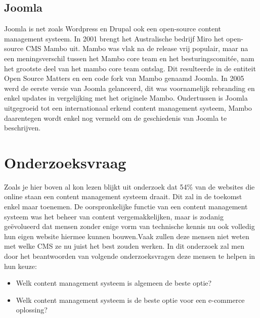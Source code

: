 \subsection{Joomla}
Joomla is net zoals Wordpress en Drupal ook een open-source content management systeem. In 2001 brengt het Australische bedrijf Miro het open-source CMS Mambo uit. Mambo was vlak na de release vrij populair, maar na een meningsverschil tussen het Mambo core team en het besturingscomitée, nam het grootste deel van het mambo core team ontslag. Dit resulteerde in de entiteit Open Source Matters en een code fork van Mambo genaamd Joomla. In 2005 werd de eerste versie van Joomla gelanceerd, dit was voornamelijk rebranding en enkel updates in vergelijking met het originele Mambo. Ondertussen is Joomla uitgegroeid tot een internationaal erkend content management systeem, Mambo daarentegen wordt enkel nog vermeld om de geschiedenis van Joomla te beschrijven.\autocite{Crowder2009} 


\section{Onderzoeksvraag}
\label{sec:onderzoeksvraag}

Zoals je hier boven al kon lezen blijkt uit onderzoek dat 54\% van de websites die online staan een content management systeem draait. Dit zal in de toekomst enkel maar toenemen. De oorspronkelijke functie van een content management systeem was het beheer van content vergemakkelijken, maar is zodanig geëvolueerd dat mensen zonder enige vorm van technische kennis nu ook volledig hun eigen website hiermee kunnen bouwen.Vaak zullen deze mensen niet weten met welke CMS ze nu juist het best zouden werken. In dit onderzoek zal men door het beantwoorden van volgende onderzoeksvragen deze mensen te helpen in hun keuze:
\begin{itemize}
	\item Welk content management systeem is algemeen de beste optie?
	\item Welk content management systeem is de beste optie voor een e-commerce oplossing?
\end{itemize}
